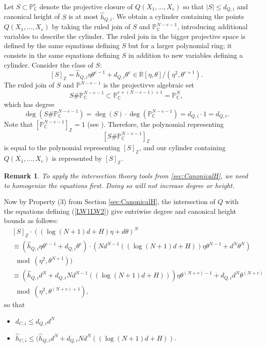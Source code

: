 \documentclass[12pt]{article}
\newcommand{\ZZ}{{\mathbb{Z}}}
\def\C{\mathbb{C}}
\def\P{\mathbb{P}}
\newtheorem{remark}[theorem]{Remark}
\def\C{\mathbb{C}}
\def\P{\mathbb{P}}
\begin{document}
\begin{itemize}
\begin{enumerate}
\begin{enumerate}
Let $S \subset \P_{\C}^e$ denote the projective closure of $Q(X_1,\hdots,X_e)$ so that $|S| \leq d_{Q,i}$ and canonical height of $S$ is at most $\hat{h}_{Q,i}$. 
We obtain a cylinder containing the points $Q(X_1,\hdots,X_e)$ by taking the ruled join of $S$ and $\P_{\C}^{N-e-1}$, introducing additional variables to describe the cylinder. The ruled join in the bigger projective space is defined by the same equations defining $S$ but for a larger polynomial ring; it consists in the same equations defining $S$ in addition to new variables defining a cylinder. Consider the class of $S:$ 
%
\begin{equation}\label{eq:cylCanny}
    [S]_{\ZZ} = \hat{h}_{Q,i}\eta \theta^{e-1} + d_{Q,i} \theta^e \in \mathbb{R}[\eta,\theta]/(\eta^2,\theta^{e+1}).
\end{equation}
%
The ruled join of $S$ and $\P^{N-e-1}$ is the projectivve algebraic set \[S \# \P_{\C}^{N-e-1} \subset \P_{\C}^{e + (N-e-1) +1}
=
\P_{\C}^N,\] 
which has degree 
%
\[
\deg (S \# \P_{\C}^{N-e-1}) = \deg( S) \cdot \deg (\P_{\C}^{N-e-1})= d_{Q,i} \cdot 1 = d_{Q,i}.
\] 
%
Note that $[ \P_{\C}^{N-e-1}]_{\ZZ}=1$ (see \cite[Proposition 1.10 (2)]{EN}). Therefore, the polynomial representing \[[S \# \P_{\C}^{N-e-1}]_{\ZZ}\] is equal to the polynomial representing $[S]_{\ZZ}$, and our cylinder containing $Q(X_1,\hdots,X_e)$ is represented by $[S]_{\ZZ}$.
%
%
\begin{remark}
    To apply the intersection theory tools from \ref{sec:CanonicalH}, we need to homogenize the equations first. Doing so will not increase degree or height. 
\end{remark}
%
Now by Property (3) from Section \ref{sec:CanonicalH}, the intersection of $Q$ with the equations defining (\ref{LW1LW2}) give entriwise degree and canonical height bounds as follows:
\begin{align*}
    &[S]_{\ZZ}\cdot ((\log(N+1)d + H)\eta + d\theta)^{N} \\
    &\equiv(\hat{h}_{Q,i}\eta \theta^{e-1} + d_{Q,i} \theta^e) \cdot \left( Nd^{N-1}((\log(N+1)d + H))\eta \theta^{N-1} + d^{N} \theta^{N}\right) \\
    &\mod (\eta^2,\theta^{N+1})) \\
    &\equiv \left(\hat{h}_{Q,i}d^{N} + d_{Q,i} Nd^{N-1}((\log(N+1)d + H))\right)\eta \theta^{(N+e)-1} + d_{Q,i} d^{N} \theta^{(N+e)} \\
    &\mod (\eta^2,\theta^{(N+e)+1}),
\end{align*}
%
so that  
\begin{itemize}
    \item $d_{C,i} \leq d_{Q,i}d^{N}$
    \item $\hat{h}_{C,i} \leq (\hat{h}_{Q,i}d^{N} + d_{Q,i} Nd^{N}((\log(N+1)d + H))$.
\end{itemize}
%





\end{enumerate}
\end{enumerate}
\end{itemize}
\end{document}
